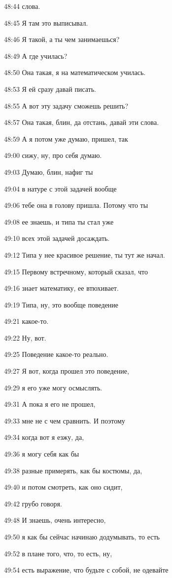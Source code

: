 48:44
слова.

48:45
Я там это выписывал.

48:46
Я такой, а ты чем занимаешься?

48:49
А где училась?

48:50
Она такая, я на математическом училась.

48:53
Я ей сразу давай писать.

48:55
А вот эту задачу сможешь решить?

48:57
Она такая, блин, да отстань, давай эти слова.

48:59
А я потом уже думаю, пришел, так

49:00
сижу, ну, про себя думаю.

49:03
Думаю, блин, нафиг ты

49:04
в натуре с этой задачей вообще

49:06
тебе она в голову пришла. Потому что ты

49:08
ее знаешь, и типа ты стал уже

49:10
всех этой задачей досаждать.

49:12
Типа у нее красивое решение, ты тут же начал.

49:15
Первому встречному, который сказал, что

49:16
знает математику, ее втюхивает.

49:19
Типа, ну, это вообще поведение

49:21
какое-то.

49:22
Ну, вот.

49:25
Поведение какое-то реально.

49:27
Я вот, когда прошел это поведение,

49:29
я его уже могу осмыслять.

49:31
А пока я его не прошел,

49:33
мне не с чем сравнить. И поэтому

49:34
когда вот я езжу, да,

49:36
я могу себя как бы

49:38
разные примерять, как бы костюмы, да,

49:40
и потом смотреть, как оно сидит,

49:42
грубо говоря.

49:48
И знаешь, очень интересно,

49:50
я как бы сейчас начинаю додумывать, то есть

49:52
в плане того, что, то есть, ну,

49:54
есть выражение, что будьте с собой, не одевайте

